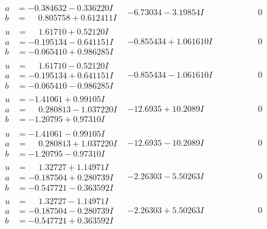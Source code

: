 \documentclass[1p]{elsarticle_modified}
\theoremstyle{definition}
\begin{document}
$$\begin{array}{c|c|c}
\begin{aligned}
a &= -0.384632 - 0.336220 I \\
b &= \phantom{-}0.805758 + 0.612411 I\end{aligned}
 & -6.73034 - 3.19854 I & \phantom{-0.000000 } 0 \\ \hline\begin{aligned}
u &= \phantom{-}1.61710 + 0.52120 I \\
a &= -0.195134 - 0.641151 I \\
b &= -0.065410 + 0.986285 I\end{aligned}
 & -0.855434 + 1.061610 I & \phantom{-0.000000 } 0 \\ \hline\begin{aligned}
u &= \phantom{-}1.61710 - 0.52120 I \\
a &= -0.195134 + 0.641151 I \\
b &= -0.065410 - 0.986285 I\end{aligned}
 & -0.855434 - 1.061610 I & \phantom{-0.000000 } 0 \\ \hline\begin{aligned}
u &= -1.41061 + 0.99105 I \\
a &= \phantom{-}0.280813 - 1.037220 I \\
b &= -1.20795 + 0.97310 I\end{aligned}
 & -12.6935 + 10.2089 I & \phantom{-0.000000 } 0 \\ \hline\begin{aligned}
u &= -1.41061 - 0.99105 I \\
a &= \phantom{-}0.280813 + 1.037220 I \\
b &= -1.20795 - 0.97310 I\end{aligned}
 & -12.6935 - 10.2089 I & \phantom{-0.000000 } 0 \\ \hline\begin{aligned}
u &= \phantom{-}1.32727 + 1.14971 I \\
a &= -0.187504 + 0.280739 I \\
b &= -0.547721 - 0.363592 I\end{aligned}
 & -2.26303 - 5.50263 I & \phantom{-0.000000 } 0 \\ \hline\begin{aligned}
u &= \phantom{-}1.32727 - 1.14971 I \\
a &= -0.187504 - 0.280739 I \\
b &= -0.547721 + 0.363592 I\end{aligned}
 & -2.26303 + 5.50263 I & \phantom{-0.000000 } 0 \\ \hline\begin{aligned}

\end{aligned}
\end{array}$$
\end{document}
